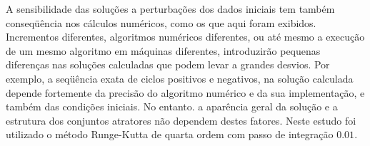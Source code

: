A sensibilidade das soluções a perturbações dos dados iniciais tem também conseqüência nos cálculos numéricos, como os que aqui foram exibidos. Incrementos diferentes, algoritmos numéricos diferentes, ou até mesmo a execução de um mesmo algoritmo em máquinas diferentes, introduzirão pequenas diferenças nas soluções calculadas que podem levar a grandes desvios. Por exemplo, a seqüência exata de ciclos positivos e negativos, na solução calculada depende fortemente da precisão do algoritmo numérico e da sua implementação, e também das condições iniciais. No entanto. a aparência geral da solução e a estrutura dos conjuntos atratores não dependem destes fatores. Neste estudo foi utilizado o método Runge-Kutta de quarta ordem com passo de integração $0.01$.
